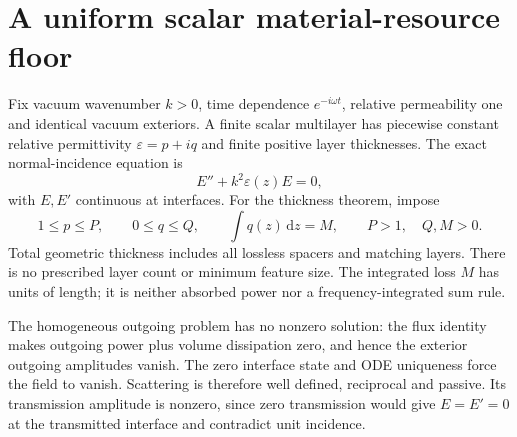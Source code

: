 \documentclass[11pt,a4paper]{article}
\theoremstyle{remark}
\newcommand{\dd}{\,\mathrm d}
\begin{document}
\section{A uniform scalar material-resource floor}\label{sec:floor}
Fix vacuum wavenumber $k>0$, time dependence $e^{-i\omega t}$, relative permeability one and identical vacuum exteriors. A finite scalar multilayer has piecewise constant relative permittivity $\varepsilon=p+iq$ and finite positive layer thicknesses. The exact normal-incidence equation is
\begin{equation}\label{eq:helmholtz}
 E''+k^2\varepsilon(z)E=0,
\end{equation}
with $E,E'$ continuous at interfaces. For the thickness theorem, impose
\begin{equation}\label{eq:material}
 1\leq p\leq P,\qquad 0\leq q\leq Q,\qquad
 \int q(z)\dd z=M,\qquad P>1,\quad Q,M>0.
\end{equation}
Total geometric thickness includes all lossless spacers and matching layers. There is no prescribed layer count or minimum feature size. The integrated loss $M$ has units of length; it is neither absorbed power nor a frequency-integrated sum rule.

The homogeneous outgoing problem has no nonzero solution: the flux identity makes outgoing power plus volume dissipation zero, and hence the exterior outgoing amplitudes vanish. The zero interface state and ODE uniqueness force the field to vanish. Scattering is therefore well defined, reciprocal and passive. Its transmission amplitude is nonzero, since zero transmission would give $E=E'=0$ at the transmitted interface and contradict unit incidence.
\end{document}

